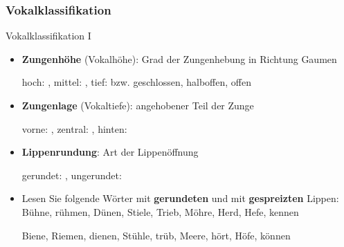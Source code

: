 \subsubsection{Vokalklassifikation}

\begin{frame}{Vokalklassifikation I}

	\begin{itemize}
		\item \textbf{Zungenhöhe} (Vokalhöhe): Grad der Zungenhebung in Richtung Gaumen

		\ea hoch: \textipa{[ i: ]}, mittel: \textipa{[ o: ]}, tief: \textipa{[ a: ]} bzw. geschlossen, halboffen, offen
		\z

\pause 

		\item \textbf{Zungenlage} (Vokaltiefe): angehobener Teil der Zunge

		\ea vorne: \textipa{[ i: ]}, zentral: \textipa{[ a: ]}, hinten: \textipa{[ u: ]}
		\z

\pause 

		\item \textbf{Lippenrundung}: Art der Lippenöffnung

		\ea gerundet: \textipa{[ o: ]}, ungerundet: \textipa{[ i: ]}
		\z

		\bigskip
 

 	\item Lesen Sie folgende Wörter mit \textbf{gerundeten} und mit \textbf{gespreizten} Lippen:
	\ea 
	\ea Bühne, rühmen, Dünen, Stiele, Trieb, Möhre, Herd, Hefe, kennen

\pause 	

	\ex  Biene, Riemen, dienen, Stühle, trüb, Meere, hört, Höfe, können
	\z  
	\z 
 
\end{itemize}

\end{frame}


